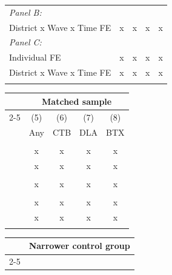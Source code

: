 \documentclass[[a4paper,11pt]{article}
\begin{document}
\begin{landscape}
\begin{table}[!htb]
{\begin{minipage}{.555\linewidth}
\begin{tabular}{l*{4}{c}}
\emph{Panel B:} \\

District  x Wave x Time FE & x & x & x & x \\
\addlinespace
\addlinespace
\emph{Panel C:}  \\
 
Individual FE & x & x & x & x \\
District  x Wave x Time FE & x & x & x & x \\
\addlinespace
\bottomrule
\end{tabular}
    \end{minipage}%
    \begin{minipage}{.3\linewidth}
      \centering
\begin{tabular}{l*{4}{c}}
\toprule
                                      	& \multicolumn{4}{c}{Matched sample}    \\
                                                      \cmidrule(lr){2-5}                                   
                                                                         &\multicolumn{1}{c}{(5)}   &\multicolumn{1}{c}{(6)}   &\multicolumn{1}{c}{(7)} &\multicolumn{1}{c}{(8)}     \\ 
            &\multicolumn{1}{c}{Any}   &\multicolumn{1}{c}{CTB}   &\multicolumn{1}{c}{DLA}    &\multicolumn{1}{c}{BTX}     \\ 
\midrule
 \\

  & x & x & x & x \\
  & x & x & x & x \\
\addlinespace
\addlinespace
  \\

  & x & x & x & x \\
   \addlinespace
\addlinespace
 \\
 
  & x & x & x & x \\
    & x & x & x & x \\
    \addlinespace
\bottomrule
\end{tabular}
 \end{minipage} 
       \begin{minipage}{0.36\linewidth}
      \centering
\begin{tabular}{l*{4}{c}}
\toprule
                  & \multicolumn{4}{c}{Narrower control group}    \\
                                                      \cmidrule(lr){2-5}                                   

\end{tabular}
\end{minipage}}
\end{table}
\end{landscape}
\end{document}
